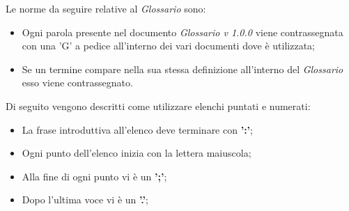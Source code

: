 Le norme da seguire relative al \textit{Glossario} sono:
\begin{itemize}
    \item Ogni parola presente nel documento \textit{Glossario v 1.0.0} viene contrassegnata con una 'G' a pedice all'interno dei vari documenti dove è utilizzata;
    \item Se un termine compare nella sua stessa definizione all'interno del \textit{Glossario } esso viene contrassegnato.
\end{itemize}

 \label{sec:elenchi_puntati_numerati}
Di seguito vengono descritti come utilizzare elenchi puntati e numerati:
\begin{itemize}
\item La frase introduttiva all'elenco deve terminare con \textbf{':'};
\item Ogni punto dell'elenco inizia con la lettera maiuscola;
\item Alla fine di ogni punto vi è un \textbf{';'};
\item Dopo l'ultima voce vi è un \textbf{'.'};
\end{itemize}

